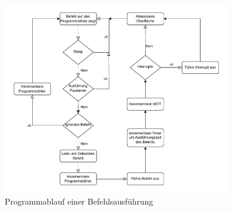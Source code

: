 \begin{figure}[H]
    \centering
    \includegraphics[width=0.9\textwidth]{./img/excec_cycle.drawio.pdf}
    \caption{Programmablauf einer Befehlsausführung}
    \label{fig:execTask}
\end{figure}


